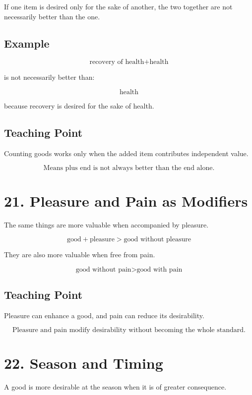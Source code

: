 \documentclass[12pt]{article}
\begin{document}
If one item is desired only for the sake of another, the two together are not
necessarily better than the one.

\subsection*{Example}

\[
\text{recovery of health} + \text{health}
\]

is not necessarily better than:

\[
\text{health}
\]

because recovery is desired for the sake of health.

\subsection*{Teaching Point}

Counting goods works only when the added item contributes independent value.

\[
\boxed{
\text{Means plus end is not always better than the end alone.}
}
\]

\section*{21. Pleasure and Pain as Modifiers}

The same things are more valuable when accompanied by pleasure.

\[
\text{good} + \text{pleasure} > \text{good without pleasure}
\]

They are also more valuable when free from pain.

\[
\text{good without pain} > \text{good with pain}
\]

\subsection*{Teaching Point}

Pleasure can enhance a good, and pain can reduce its desirability.

\[
\boxed{
\text{Pleasure and pain modify desirability without becoming the whole standard.}
}
\]

\section*{22. Season and Timing}

A good is more desirable at the season when it is of greater consequence.
\end{document}

